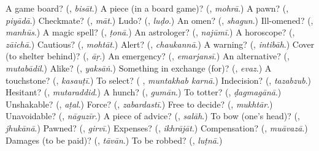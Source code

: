 \begin{tcolorbox}[breakable,colback=teal!4,colframe=teal!35!black,title={Before you move on}]
A game board? (\textbf{}, \emph{bisāt}.) A piece (in a board game)? (\textbf{}, \emph{mohrā}.) A pawn? (\textbf{}, \emph{piyādā}.) Checkmate? (\textbf{}, \emph{māt}.) Ludo? (\textbf{}, \emph{luḍo}.) An omen? (\textbf{}, \emph{shagun}.) Ill-omened? (\textbf{}, \emph{manhūs}.) A magic spell? (\textbf{}, \emph{ṭonā}.) An astrologer? (\textbf{}, \emph{najūmī}.) A horoscope? (\textbf{}, \emph{zāichā}.) Cautious? (\textbf{}, \emph{mohtāt}.) Alert? (\textbf{}, \emph{chaukannā}.) A warning? (\textbf{}, \emph{intibāh}.) Cover (to shelter behind)? (\textbf{}, \emph{āṛ}.) An emergency? (\textbf{}, \emph{emarjansī}.) An alternative? (\textbf{}, \emph{mutabādil}.) Alike? (\textbf{}, \emph{yaksāṅ}.) Something in exchange (for)? (\textbf{}, \emph{evaz}.) A touchstone? (\textbf{}, \emph{kasauṭī}.) To select? (\textbf{ }, \emph{muntakhab karnā}.) Indecision? (\textbf{}, \emph{tazabzub}.) Hesitant? (\textbf{}, \emph{mutaraddid}.) A hunch? (\textbf{}, \emph{gumān}.) To totter? (\textbf{}, \emph{ḍagmagānā}.) Unshakable? (\textbf{}, \emph{aṭal}.) Force? (\textbf{}, \emph{zabardastī}.) Free to decide? (\textbf{}, \emph{mukhtār}.) Unavoidable? (\textbf{}, \emph{nāguzīr}.) A piece of advice? (\textbf{}, \emph{salāh}.) To bow (one's head)? (\textbf{}, \emph{jhukānā}.) Pawned? (\textbf{}, \emph{girvī}.) Expenses? (\textbf{}, \emph{ikhrājāt}.) Compensation? (\textbf{}, \emph{muāvazā}.) Damages (to be paid)? (\textbf{}, \emph{tāvān}.) To be robbed? (\textbf{}, \emph{luṭnā}.)
\end{tcolorbox}
